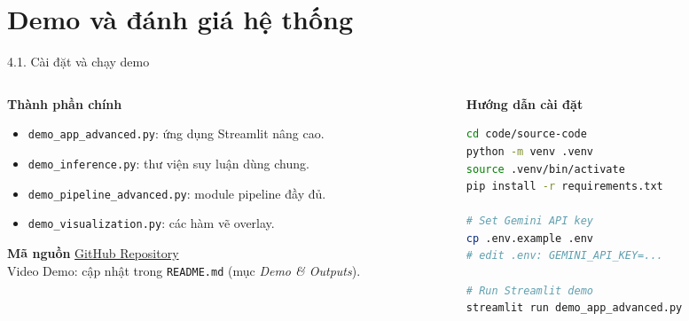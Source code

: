 \documentclass[11pt]{beamer}
\begin{document}
\section{Demo và đánh giá hệ thống}

\begin{frame}[fragile, shrink=5]{4.1. Cài đặt và chạy demo}
\scriptsize

\begin{columns}[T,onlytextwidth]
\begin{column}{0.52\textwidth}

\begin{block}{\textbf{Thành phần chính}}
\begin{itemize}
  \item \texttt{demo\_app\_advanced.py}: ứng dụng Streamlit nâng cao.
  \item \texttt{demo\_inference.py}: thư viện suy luận dùng chung.
  \item \texttt{demo\_pipeline\_advanced.py}: module pipeline đầy đủ.
  \item \texttt{demo\_visualization.py}: các hàm vẽ overlay.
\end{itemize}
\end{block}

\begin{block}{\textbf{Mã nguồn}}
\href{https://github.com/paht2005/CS338.Q21_Zero-shot-Object-Coutning-with-Good-Examplers}{GitHub Repository}\\
Video Demo: cập nhật trong \texttt{README.md} (mục \emph{Demo \& Outputs}).
\end{block}

\end{column}

\begin{column}{0.45\textwidth}

\begin{block}{\textbf{Hướng dẫn cài đặt}}
\begin{lstlisting}[style=codestyle, language=bash, numbers=none]
cd code/source-code
python -m venv .venv
source .venv/bin/activate
pip install -r requirements.txt

# Set Gemini API key
cp .env.example .env
# edit .env: GEMINI_API_KEY=...

# Run Streamlit demo
streamlit run demo_app_advanced.py
\end{lstlisting}
\end{block}

\end{column}
\end{columns}

\end{frame}
\end{document}
